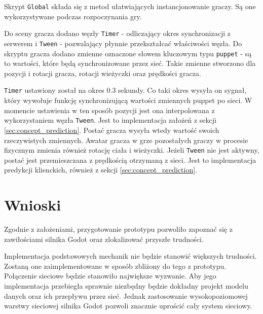 Skrypt \texttt{Global} składa się z metod ułatwiających instancjonowanie graczy. Są one wykorzystywane podczas rozpoczynania gry.

Do sceny gracza dodano węzły \texttt{Timer} - odliczający okres synchronizacji z serwerem i \texttt{Tween} - pozwalający płynnie przekształcać właściwości węzła. Do skryptu gracza dodano zmienne oznaczone słowem kluczowym typu \texttt{puppet} - są to wartości, które będą synchronizowane przez sieć. Takie zmienne stworzono dla pozycji i rotacji gracza, rotacji wieżyczki oraz prędkości gracza. 

\texttt{Timer} ustawiony został na okres 0.3 sekundy. Co taki okres wysyła on sygnał, który wywołuje funkcję synchronizującą wartości zmiennych puppet po sieci. W momencie ustawienia w ten sposób pozycji jest ona interpolowana z wykorzystaniem węzła \texttt{Tween}. Jest to implementacja założeń z sekcji \ref{sec:concept_prediction}. Postać gracza wysyła wtedy wartość swoich rzeczywistych zmiennych. Awatar gracza w grze pozostałych graczy w procesie fizycznym zmienia również rotację ciała i wieżyczki. Jeżeli \texttt{Tween} nie jest aktywny, postać jest przemieszczana z prędkością otrzymaną z sieci. Jest to implementacja predykcji klienckich, również z sekcji \ref{sec:concept_prediction}.


\section{Wnioski}

Zgodnie z założeniami, przygotowanie prototypu pozwoliło zapoznać się z zawiłościami silnika Godot oraz zlokalizować przyszłe trudności. 

Implementacja podstawowych mechanik nie będzie stanowić większych trudności. Zostaną one zaimplementowane w sposób zbliżony do tego z prototypu. Połączenie sieciowe będzie stanowiło największe wyzwanie. Aby jego implementacja przebiegła sprawnie niezbędny będzie dokładny projekt modelu danych oraz ich przepływu przez sieć. Jednak zastosowanie wysokopoziomowej warstwy sieciowej silnika Godot pozwoli znacznie uprościć cały system sieciowy.


